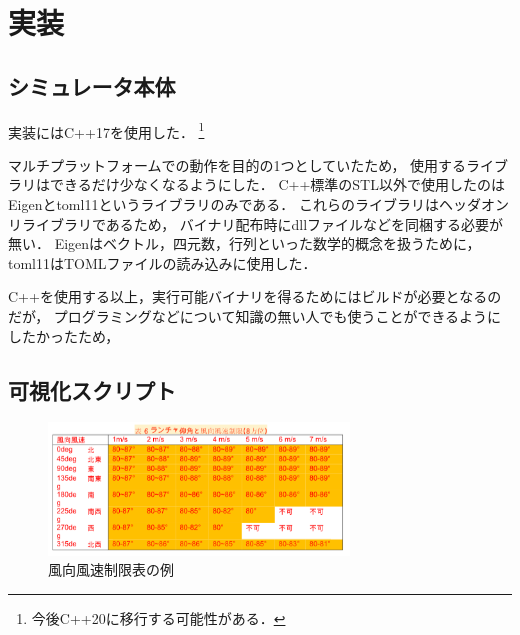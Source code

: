 \documentclass[a4j,10pt]{jsarticle}
\begin{document}
\section{実装}

\subsection{シミュレータ本体}

実装にはC++17を使用した．
\footnote{今後C++20に移行する可能性がある．}

マルチプラットフォームでの動作を目的の1つとしていたため，
使用するライブラリはできるだけ少なくなるようにした．
C++標準のSTL以外で使用したのはEigenとtoml11というライブラリのみである．
これらのライブラリはヘッダオンリライブラリであるため，
バイナリ配布時にdllファイルなどを同梱する必要が無い．
Eigenはベクトル，四元数，行列といった数学的概念を扱うために，
toml11はTOMLファイルの読み込みに使用した．


C++を使用する以上，実行可能バイナリを得るためにはビルドが必要となるのだが，
プログラミングなどについて知識の無い人でも使うことができるようにしたかったため，

\subsection{可視化スクリプト}

\begin{figure}[htbp]
	\begin{center}
		\includegraphics[width=8cm]{./restrict-table-example.png}
		\caption{風向風速制限表の例}
		\label{restrict-table-example}
	\end{center}
\end{figure}

\end{document}
